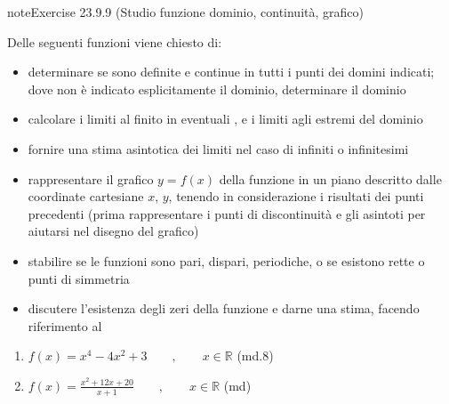 \documentclass[letterpaper,10pt,italian]{jupyterBook}
\begin{document}
\begin{sphinxadmonition}{note}{Exercise 23.9.9 (Studio funzione \sphinxhyphen{} dominio, continuità, grafico)}



\sphinxAtStartPar
Delle seguenti funzioni viene chiesto di:
\begin{itemize}
\item {} 
\sphinxAtStartPar
determinare se sono definite e continue in tutti i punti dei domini indicati; dove non è indicato esplicitamente il dominio, determinare il dominio

\item {} 
\sphinxAtStartPar
calcolare i limiti al finito in eventuali {\hyperref[\detokenize{ch/infinitesimal_calculus/analysis:infinitesimal-calculus-continuous-fun-disc}]{}}, e i limiti agli estremi del dominio

\item {} 
\sphinxAtStartPar
fornire una stima asintotica dei limiti nel caso di infiniti o infinitesimi

\item {} 
\sphinxAtStartPar
rappresentare il grafico \(y = f(x)\) della funzione in un piano descritto dalle coordinate cartesiane \(x\), \(y\), tenendo in considerazione i risultati dei punti precedenti (prima rappresentare i punti di discontinuità e gli asintoti per aiutarsi nel disegno del grafico)

\item {} 
\sphinxAtStartPar
stabilire se le funzioni sono pari, dispari, periodiche, o se esistono rette o punti di simmetria

\item {} 
\sphinxAtStartPar
discutere l’esistenza degli zeri della funzione e darne una stima, facendo riferimento al {\hyperref[\detokenize{ch/infinitesimal_calculus/analysis:infinitesimal-calculus-continuous-fun-thms-zeros}]{}}

\end{itemize}
\begin{enumerate}
%
\item {} 
\sphinxAtStartPar
\(f(x) = x^4-4x^2+3 \qquad , \qquad x \in \mathbb{R}\) (md.8)

\item {} 
\sphinxAtStartPar
\(f(x) = \frac{x^2+12 x +20}{x+1} \qquad , \qquad x \in \mathbb{R}\) (md)


\end{enumerate}
\end{sphinxadmonition}
\end{document}
